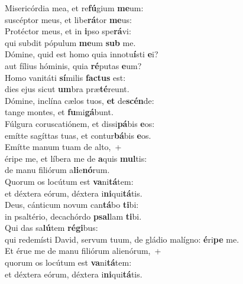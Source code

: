 \evenverse Misericórdia mea, et re\textbf{fú}gium \textbf{me}um:~\*\\
\evenverse suscéptor meus, et libe\textbf{rá}tor \textbf{me}us:\\
\oddverse Protéctor meus, et in \textbf{i}pso spe\textbf{rá}vi:~\*\\
\oddverse qui subdit pópulum \textbf{me}um \textbf{sub} me.\\
\evenverse Dómine, quid est homo quia innotu\textbf{í}sti \textbf{e}i?~\*\\
\evenverse aut fílius hóminis, quia \textbf{ré}putas \textbf{e}um?\\
\oddverse Homo vanitáti \textbf{sí}milis \textbf{fa}\textbf{ctus} est:~\*\\
\oddverse dies ejus sicut \textbf{um}bra præ\textbf{té}reunt.\\
\evenverse Dómine, inclína cælos tuos, \textbf{et} de\textbf{scén}de:~\*\\
\evenverse tange montes, et \textbf{fu}mi\textbf{gá}bunt.\\
\oddverse Fúlgura coruscatiónem, et dissi\textbf{pá}bis \textbf{e}os:~\*\\
\oddverse emítte sagíttas tuas, et contur\textbf{bá}bis \textbf{e}os.\\
\evenverse Emítte manum tuam de alto,~+\\
\evenverse  éripe me, et líbera me de \textbf{a}quis \textbf{mul}tis:~\*\\
\evenverse de manu filiórum a\textbf{li}e\textbf{nó}rum.\\
\oddverse Quorum os locútum est \textbf{va}ni\textbf{tá}tem:~\*\\
\oddverse et déxtera eórum, déxtera i\textbf{ni}qui\textbf{tá}tis.\\
\evenverse Deus, cánticum novum can\textbf{tá}bo \textbf{ti}bi:~\*\\
\evenverse in psaltério, decachórdo \textbf{psal}lam \textbf{ti}bi.\\
\oddverse Qui das sa\textbf{lú}tem \textbf{ré}\textbf{gi}bus:~\*\\
\oddverse qui redemísti David, servum tuum, de gládio malígno: \textbf{é}ri\textbf{pe} me.\\
\evenverse Et érue me de manu filiórum alienórum,~+\\
\evenverse  quorum os locútum est \textbf{va}ni\textbf{tá}tem:~\*\\
\evenverse et déxtera eórum, déxtera i\textbf{ni}qui\textbf{tá}tis.\\
